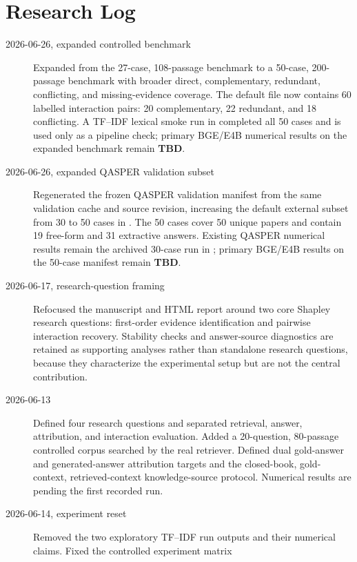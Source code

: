 \section*{Research Log}
\begin{description}
  \item[2026-06-26, expanded controlled benchmark] Expanded
   from the 27-case, 108-passage
  benchmark to a 50-case, 200-passage benchmark with broader direct,
  complementary, redundant, conflicting, and missing-evidence coverage. The
  default file now contains 60 labelled interaction pairs: 20 complementary,
  22 redundant, and 18 conflicting. A TF--IDF lexical smoke run in
   completed all
  50 cases and is used only as a pipeline check; primary BGE/E4B numerical
  results on the expanded benchmark remain \textbf{TBD}.
  \item[2026-06-26, expanded QASPER validation subset] Regenerated the frozen
  QASPER validation manifest from the same validation cache and source
  revision, increasing the default external subset from 30 to 50 cases in
  . The 50 cases cover 50 unique
  papers and contain 19 free-form and 31 extractive answers. Existing QASPER
  numerical results remain the archived 30-case run in
  ; primary BGE/E4B
  results on the 50-case manifest remain \textbf{TBD}.
  \item[2026-06-17, research-question framing] Refocused the manuscript and
  HTML report around two core Shapley research questions: first-order evidence
  identification and pairwise interaction recovery. Stability checks and
  answer-source diagnostics are retained as supporting analyses rather than
  standalone research questions, because they characterize the experimental
  setup but are not the central contribution.
  \item[2026-06-13] Defined four research questions and separated retrieval,
  answer, attribution, and interaction evaluation. Added a 20-question,
  80-passage controlled corpus searched by the real retriever. Defined dual
  gold-answer and generated-answer attribution targets and the closed-book,
  gold-context, retrieved-context knowledge-source protocol. Numerical results
  are pending the first recorded run.
  \item[2026-06-14, experiment reset] Removed the two exploratory TF--IDF run
  outputs and their numerical claims. Fixed the controlled experiment matrix

\end{description}
